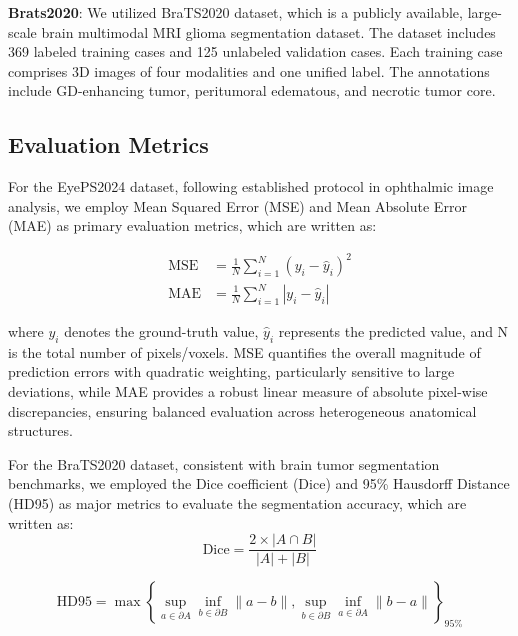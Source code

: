 \documentclass[AMA,Times1COL]{WileyNJDv5} %
\begin{document}
\textbf{Brats2020}: We utilized BraTS2020 dataset\cite{menze2014multimodal-brats1}\cite{bakas2017advancing-brats2}, which is a publicly available, large-scale brain multimodal MRI glioma segmentation dataset. The dataset includes 369 labeled training cases and 125 unlabeled validation cases. Each training case comprises 3D images of four modalities and one unified label. The annotations include GD-enhancing tumor, peritumoral edematous, and necrotic tumor core.

\subsection{Evaluation Metrics}
For the EyePS2024 dataset, following established protocol in ophthalmic image analysis\cite{oh2024prediction}, we employ Mean Squared Error (MSE) and Mean Absolute Error (MAE) as primary evaluation metrics, which are written as:

\begin{equation}
\begin{aligned}
    \text{MSE} &= \frac{1}{N}\sum_{i=1}^{N}(y_i - \hat{y}_i)^2 \\
    \text{MAE} &= \frac{1}{N}\sum_{i=1}^{N}|y_i - \hat{y}_i|
\end{aligned}
\end{equation}

where $y_i$ denotes the ground-truth value, $\hat{y}_i$ represents the predicted value, and N is the total number of pixels/voxels. MSE quantifies the overall magnitude of prediction errors with quadratic weighting, particularly sensitive to large deviations, while MAE provides a robust linear measure of absolute pixel-wise discrepancies, ensuring balanced evaluation across heterogeneous anatomical structures.

For the BraTS2020 dataset, consistent with brain tumor segmentation benchmarks\cite{menze2014multimodal,chen2024adaptive}, we employed the Dice coefficient (Dice) and 95\% Hausdorff Distance (HD95) as major metrics to evaluate the segmentation accuracy, which are written as:
\begin{equation}
    \mathrm{Dice}=\frac{2\times|A\cap B|}{|A|+|B|}
\end{equation}

\begin{equation}
\mathrm{HD95}=\max\left\{\sup_{a\in\partial A}\inf_{b\in\partial B}\|a-b\|,\sup_{b\in\partial B}\inf_{a\in\partial A}\|b-a\|\right\}_{95\%}
\end{equation}
\end{document}
